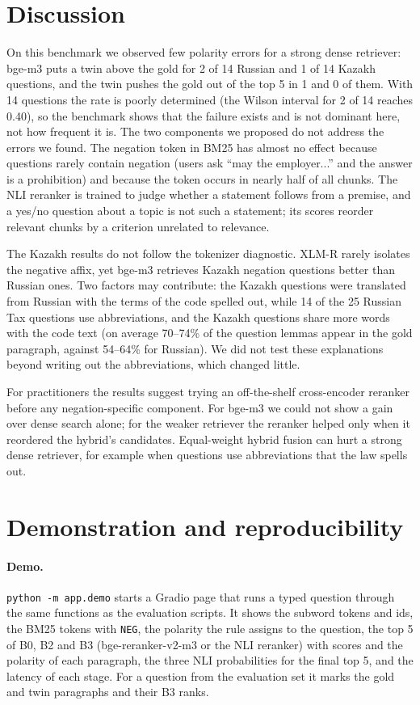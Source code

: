\documentclass[11pt]{article}
\begin{document}
\section{Discussion}

On this benchmark we observed few polarity errors for a strong dense retriever: bge-m3 puts a twin above the
gold for 2 of 14 Russian and 1 of 14 Kazakh questions, and the twin pushes the gold out of the top 5 in 1 and
0 of them. With 14 questions the rate is poorly determined (the Wilson interval for 2 of 14 reaches 0.40), so
the benchmark shows that the failure exists and is not dominant here, not how frequent it is. The two
components we proposed do not address the errors we found. The negation token in BM25 has almost no effect
because questions rarely contain negation (users ask ``may the employer...'' and the answer is a prohibition)
and because the token occurs in nearly half of all chunks. The NLI reranker is trained to judge whether a
statement follows from a premise, and a yes/no question about a topic is not such a statement; its scores
reorder relevant chunks by a criterion unrelated to relevance.

The Kazakh results do not follow the tokenizer diagnostic. XLM-R rarely isolates the negative affix, yet bge-m3
retrieves Kazakh negation questions better than Russian ones. Two factors may contribute: the Kazakh questions
were translated from Russian with the terms of the code spelled out, while 14 of the 25 Russian Tax questions
use abbreviations, and the Kazakh questions share more words with the code text (on average 70--74\% of the
question lemmas appear in the gold paragraph, against 54--64\% for Russian). We did not test these
explanations beyond writing out the abbreviations, which changed little.

For practitioners the results suggest trying an off-the-shelf cross-encoder reranker before any
negation-specific component. For bge-m3 we could not show a gain over dense search alone; for the weaker
retriever the reranker helped only when it reordered the hybrid's candidates. Equal-weight hybrid fusion
can hurt a strong dense retriever, for example when questions use abbreviations that the law spells out.

\section{Demonstration and reproducibility}

\paragraph{Demo.} \texttt{python -m app.demo} starts a Gradio page that runs a typed question through the same
functions as the evaluation scripts. It shows the subword tokens and ids, the BM25 tokens with \texttt{NEG}, the
polarity the rule assigns to the question, the top 5 of B0, B2 and B3 (bge-reranker-v2-m3 or the NLI reranker)
with scores and the polarity of each paragraph, the three NLI probabilities for the final top 5, and the latency of
each stage. For a question from the evaluation set it marks the gold and twin paragraphs and their B3 ranks.
\end{document}
